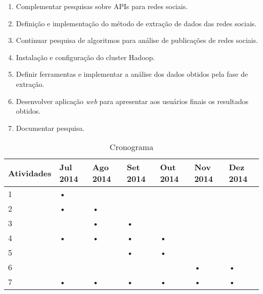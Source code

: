 \begin{enumerate}

  \item Complementar pesquisas sobre APIs para redes sociais.
  \item Definição e implementação do método de extração de dados das redes sociais.
  \item Continuar pesquisa de algoritmos para análise de publicações de redes sociais.
  \item Instalação e configuração do cluster Hadoop.
  \item Definir ferramentas e implementar a análise dos dados obtidos pela fase de extração.
  \item Desenvolver aplicação \textit{web} para apresentar aos usuários finais os resultados obtidos.
  \item Documentar pesquisa.

\end{enumerate}


\begin{table}[!ht]
\begin{center}
  \begin{tabular}{|p{2cm}|p{2cm}|p{2cm}|p{2cm}|p{2cm}|p{2cm}|p{2cm}|}
	\hline
	Atividades & Jul 2014 & Ago 2014 & Set 2014 & Out 2014 & Nov 2014 & Dez 2014
	\\ \hline
	1 & • &   &   &   &   &   	\\ \hline
	2 & • & • &   &   &   &   	\\ \hline
	3 &   & • & • &   &   &   	\\ \hline
	4 & • & • & • & • &   &   	\\ \hline
	5 &   &   & • & • &   &   	\\ \hline
	6 &   &   &   &   & • & •   	\\ \hline
	7 & • & • & • & • & • & •   	\\ \hline
  \end{tabular}
  \caption{Cronograma}
\label{tab-cron}
\end{center}
\end{table}
\FloatBarrier















